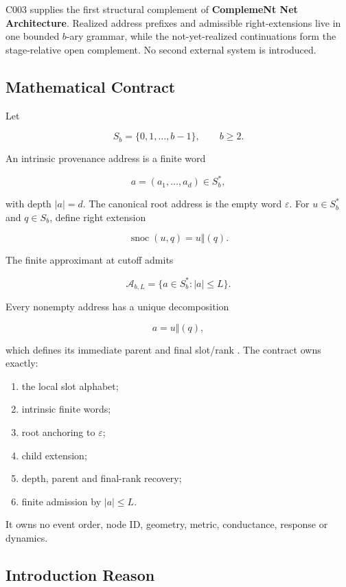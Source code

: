 C003 supplies the first structural complement of \textbf{ComplemeNt Net
Architecture}. Realized address prefixes and admissible right-extensions
live in one bounded \(b\)-ary grammar, while the not-yet-realized
continuations form the stage-relative open complement. No second
external system is introduced.

\subsection{Mathematical Contract}\label{mathematical-contract-1}

Let

\[
S_b=\{0,1,\ldots,b-1\},\qquad b\ge2.
\]

An intrinsic provenance address is a finite word

\[
a=(a_1,\ldots,a_d)\in S_b^*,
\]

with depth \(|a|=d\). The canonical root address is the empty word
\(\varepsilon\). For \(u\in S_b^*\) and \(q\in S_b\), define right
extension

\[
\operatorname{snoc}(u,q)=u\Vert(q).
\]

The finite approximant at cutoff \texttt{\protect{}} admits

\[
\mathcal A_{b,L}=\{a\in S_b^*:|a|\le L\}.
\]

Every nonempty address has a unique decomposition

\[
a=u\Vert(q),
\]

which defines its immediate parent \texttt{\protect{}} and final slot/rank
\texttt{\protect{}}. The contract owns exactly:

\begin{enumerate}
\def\labelenumi{\arabic{enumi}.}
\tightlist
\item
  the local slot alphabet;
\item
  intrinsic finite words;
\item
  root anchoring to \(\varepsilon\);
\item
  child extension;
\item
  depth, parent and final-rank recovery;
\item
  finite admission by \(|a|\le L\).
\end{enumerate}

It owns no event order, node ID, geometry, metric, conductance, response
or dynamics.

\subsection{Introduction Reason}\label{introduction-reason-4}

